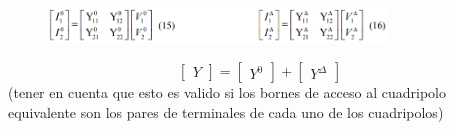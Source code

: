 \documentclass[../main.tex]{subfiles}
\begin{document}
{%
		\begin{figure}[H]
			\centering
			\includegraphics[width=0.8\textwidth]{imagen4.png}
		\end{figure}
		{}
		\[
		\begin{bmatrix} Y \end{bmatrix} 
			=
		\begin{bmatrix} Y^0 \end{bmatrix} 
			+
		\begin{bmatrix} Y^{\Delta} \end{bmatrix} 
		\]
		(tener en cuenta que esto es valido si los bornes de acceso al
		cuadripolo equivalente son los pares de terminales de 
		cada uno de los cuadripolos)


}
\end{document}
